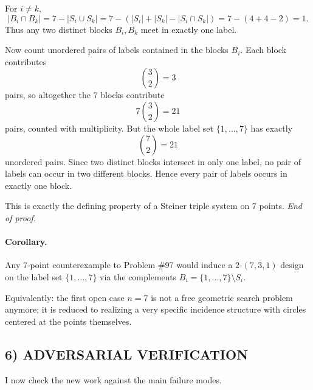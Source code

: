 For $i\neq k$,
\[
|B_i\cap B_k|
=
7-|S_i\cup S_k|
=
7-(|S_i|+|S_k|-|S_i\cap S_k|)
=
7-(4+4-2)=1.
\]
Thus any two distinct blocks $B_i,B_k$ meet in exactly one label.

Now count unordered pairs of labels contained in the blocks $B_i$.
Each block contributes
\[
\binom{3}{2}=3
\]
pairs, so altogether the $7$ blocks contribute
\[
7\binom{3}{2}=21
\]
pairs, counted with multiplicity.
But the whole label set $\{1,\dots,7\}$ has exactly
\[
\binom{7}{2}=21
\]
unordered pairs.
Since two distinct blocks intersect in only one label, no pair of labels can occur in two different blocks.
Hence every pair of labels occurs in exactly one block.

This is exactly the defining property of a Steiner triple system on $7$ points. \hfill\emph{End of proof.}

\medskip

\paragraph{Corollary.}
Any $7$-point counterexample to Problem \#97 would induce a $2$-$(7,3,1)$ design on the label set $\{1,\dots,7\}$ via the complements $B_i=\{1,\dots,7\}\setminus S_i$.

Equivalently: the first open case $n=7$ is not a free geometric search problem anymore; it is reduced to realizing a very specific incidence structure with circles centered at the points themselves.

\subsection*{6) ADVERSARIAL VERIFICATION}

I now check the new work against the main failure modes.

